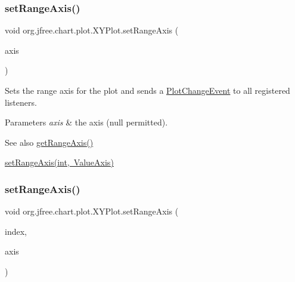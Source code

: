\subsubsection{\texorpdfstring{set\+Range\+Axis()}{setRangeAxis()}\hspace{0.1cm}{\footnotesize\ttfamily [1/3]}}
{\footnotesize\ttfamily void org.\+jfree.\+chart.\+plot.\+X\+Y\+Plot.\+set\+Range\+Axis (\begin{DoxyParamCaption}\item[{\mbox{\hyperlink{classorg_1_1jfree_1_1chart_1_1axis_1_1_value_axis}{Value\+Axis}}}]{axis }\end{DoxyParamCaption})}

Sets the range axis for the plot and sends a \mbox{\hyperlink{}{Plot\+Change\+Event}} to all registered listeners.


\begin{DoxyParams}{Parameters}
{\em axis} & the axis ({\ttfamily null} permitted).\\
\hline
\end{DoxyParams}
\begin{DoxySeeAlso}{See also}
\mbox{\hyperlink{classorg_1_1jfree_1_1chart_1_1plot_1_1_x_y_plot_ae0fb9228ae5f8d5019fe6bdbe5f2807e}{get\+Range\+Axis()}} 

\mbox{\hyperlink{classorg_1_1jfree_1_1chart_1_1plot_1_1_x_y_plot_adf8ca4d952a2871070c70d1dca674ec6}{set\+Range\+Axis(int, Value\+Axis)}} 
\end{DoxySeeAlso}
\mbox{\label{classorg_1_1jfree_1_1chart_1_1plot_1_1_x_y_plot_adf8ca4d952a2871070c70d1dca674ec6}} 
\subsubsection{\texorpdfstring{set\+Range\+Axis()}{setRangeAxis()}\hspace{0.1cm}{\footnotesize\ttfamily [2/3]}}
{\footnotesize\ttfamily void org.\+jfree.\+chart.\+plot.\+X\+Y\+Plot.\+set\+Range\+Axis (\begin{DoxyParamCaption}\item[{int}]{index,  }\item[{\mbox{\hyperlink{classorg_1_1jfree_1_1chart_1_1axis_1_1_value_axis}{Value\+Axis}}}]{axis }\end{DoxyParamCaption})}

